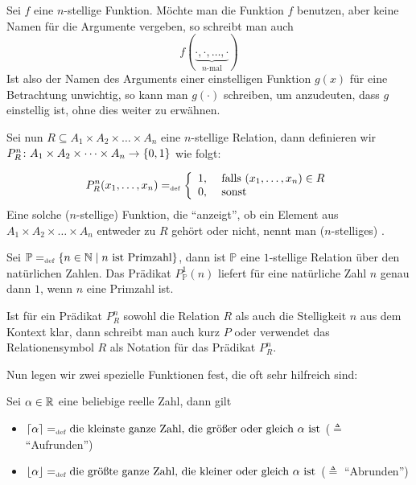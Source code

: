 \begin{definition}
Sei $f$ eine $n$-stellige Funktion. Möchte man die Funktion $f$
benutzen, aber keine Namen für die Argumente vergeben, so
schreibt man auch 
\begin{displaymath}
f(\underbrace{\cdot, \cdot, \ldots , \cdot}_{\text{$n$-mal}})
\end{displaymath}
Ist also der Namen des Arguments einer einstelligen Funktion $g(x)$
für eine Betrachtung unwichtig, so kann man
$g(\cdot)$  schreiben, um anzudeuten, dass $g$
einstellig ist, ohne dies weiter zu erwähnen.
\end{definition}

Sei nun $R \subseteq A_1 \times A_2 \times \dots \times A_n$ eine
$n$-stellige Relation, dann definieren wir $P^n_R \colon A_1 \times
A_2 \times \dots \times A_n \rightarrow \{0,1\}$ wie folgt:

\begin{displaymath}
P^n_R({x_{1}}, \allowbreak \dots , \allowbreak{x_{n}}) =_{\mathrm{\scriptscriptstyle def}} 
\left\{
\begin{array}{rl}
1,& \text{ falls $({x_{1}}, \allowbreak \dots , \allowbreak{x_{n}}) \in R$}\\
0,& \text{ sonst} 
\end{array}
\right.
\end{displaymath}
Eine solche ($n$-stellige) Funktion, die "`anzeigt"', ob ein Element 
aus $A_1 \times A_2 \times \dots \times A_n$ entweder zu $R$ gehört 
oder nicht, nennt man ($n$-stelliges) .

\begin{example}
Sei $\mathbb{P} =_{\mathrm{\scriptscriptstyle def}} \{n \in \mathbb N \mid \text{$n$ ist Primzahl}\}$, dann
ist $\mathbb{P}$ eine $1$-stellige Relation über den natürlichen Zahlen. 
Das Prädikat $P^1_{\mathbb{P}}(n)$ liefert für eine natürliche Zahl
$n$ genau dann $1$, wenn $n$ eine Primzahl ist.
\end{example}

Ist für ein Prädikat $P^n_R$ sowohl die Relation $R$ als auch die
Stelligkeit $n$ aus dem Kontext klar, dann schreibt man auch kurz $P$
oder verwendet das Relationensymbol $R$ als Notation für das Prädikat
$P^n_R$. 

\bigskip

\noindent Nun legen wir zwei spezielle Funktionen fest, die oft sehr
hilfreich sind:
\begin{definition}
\label{floorceil}
Sei $\alpha \in \mathbb R$ eine beliebige reelle Zahl, dann gilt
\begin{itemize}
%
\item $\lceil \alpha \rceil =_{\mathrm{\scriptscriptstyle def}} \text{die kleinste ganze Zahl, die größer
oder gleich $\alpha$ ist}$ ($\triangleq$ "`Aufrunden"') \index{$\lceil \cdot \rceil$}
%
\item $\lfloor \alpha \rfloor =_{\mathrm{\scriptscriptstyle def}} \text{die größte ganze Zahl, die kleiner
oder gleich $\alpha$ ist}$ ($\triangleq$ "`Abrunden"') \index{$\lfloor \cdot \rfloor$}
%
\end{itemize}
\end{definition}

